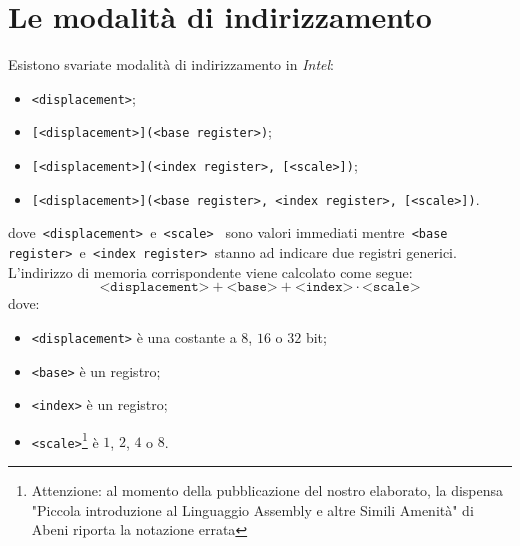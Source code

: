 \documentclass[class=book, crop=false, oneside]{standalone}
\begin{document}
\section{Le modalità di indirizzamento}
Esistono svariate modalità di indirizzamento in \emph{Intel}:
\begin{itemize}
	\item \texttt{<displacement>};
	\item \texttt{[<displacement>](<base register>)};
	\item \texttt{[<displacement>](<index register>, [<scale>])};
	\item \texttt{[<displacement>](<base register>, <index register>, [<scale>])}.
\end{itemize}
dove\texttt{ <displacement> }e\texttt{ <scale> } sono valori immediati mentre\texttt{ <base register> }e\texttt{ <index register> }stanno ad indicare due registri generici. L'indirizzo di memoria corrispondente viene calcolato come segue:
\begin{equation*}
	\texttt{<displacement>} + \texttt{<base>} + \texttt{<index>} \cdot\texttt{<scale>}
\end{equation*}
dove:
\begin{itemize}
	\item \texttt{<displacement>} è una costante a \(8\), \(16\) o \(32\) bit;
	\item \texttt{<base>} è un registro;
	\item \texttt{<index>} è un registro;
	\item \texttt{<scale>}\footnote{Attenzione: al momento della pubblicazione del nostro elaborato, la dispensa "Piccola introduzione al Linguaggio Assembly e altre Simili Amenità" di Abeni riporta la notazione errata} è \(1\), \(2\), \(4\) o \(8\).
\end{itemize}
\end{document}
